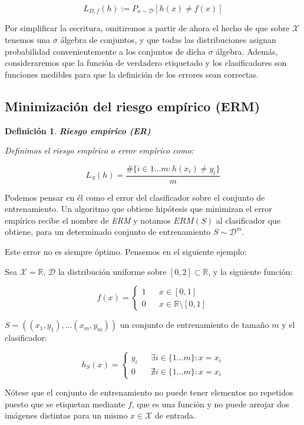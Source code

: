 \documentclass[11pt]{article}
\newtheorem{definition}{Definición}
\begin{document}
\[L_{D,f}(h) :=  P_{x\sim \mathcal{D}} [h(x)\neq f(x)]\]

Por simplificar la escritura, omitiremos a partir de ahora el hecho de que sobre $\mathcal{X}$ tenemos una $\sigma$ álgebra de conjuntos, y que todas las distribuciones asignan probabilidad convenientemente a los conjuntos de dicha $\sigma$ álgebra. Además, consideraremos que la función de verdadero etiquetado y los clasificadores son funciones medibles para que la definición de los errores sean correctas.

\subsection{Minimización del riesgo empírico (ERM)}
\label{sec-1-1}

\begin{definition}
\textbf{Riesgo empírico (ER)}

Definimos el riesgo empírico o error empírico como:

\[L_S(h) = \frac{\#\{i\in {1\ldots m}: h(x_i) \neq y_i\}}{m}\]
\end{definition}

Podemos pensar en él como el error del clasificador sobre el conjunto de entrenamiento. Un algoritmo que obtiene hipótesis que minimizan el error empírico recibe el nombre de \emph{ERM} y notamos $ERM(S)$ al clasificador que obtiene, para un determinado conjunto de entrenamiento $S \sim \mathcal{D}^m$.

Este error no es siempre óptimo. Pensemos en el siguiente ejemplo:

Sea $\mathcal{X} = \mathbb{R}$, $\mathcal{D}$ la distribución uniforme sobre $[0,2]\subset \mathbb{R}$, y la siguiente función:

\[f(x) = \left\{\begin{array}{lcl}
1 && x\in [0,1]\\
0 && x\in \mathbb{R}\setminus [0,1]
\end{array}\right.\]


$S = ((x_1,y_1), \ldots (x_m, y_m))$ un conjunto de entrenamiento de tamaño $m$ y el clasificador:

\[h_S(x) = \left\{\begin{array}{lcl}
y_i && \exists i\in \{1\ldots m\} : x=x_i\\
0 && \nexists i\in \{1\ldots m\} : x=x_i
\end{array}\right.\]

Nótese que el conjunto de entrenamiento no puede tener elementos no repetidos puesto que se etiquetan mediante $f$, que es una función y no puede arrojar dos imágenes distintas para un mismo $x \in \mathcal{X}$ de entrada.
\end{document}
